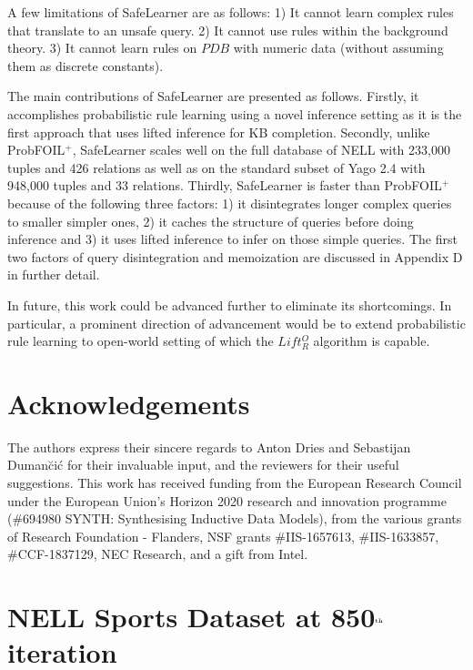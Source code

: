 \documentclass[akbc,twoside,11pt]{article}
\newcommand{\algorithmname}{SafeLearner\xspace}
\begin{document}
A few limitations of \algorithmname are as follows: 1) It cannot learn complex rules that translate to an unsafe query. 2) It cannot use rules within the background theory. %
3) It cannot learn rules on $PDB$ with numeric data (without assuming them as discrete constants).

The main contributions of \algorithmname are presented as follows. Firstly, it accomplishes probabilistic rule learning using a novel inference setting as it is the first approach that uses lifted inference for KB completion. Secondly, unlike ProbFOIL$^+$, \algorithmname scales well on the full database of NELL with 233,000 tuples and 426 relations as well as on the standard subset of Yago 2.4 with 948,000 tuples and 33 relations. Thirdly, \algorithmname is faster than ProbFOIL$^+$ because of the following three factors: 1) it disintegrates longer complex queries to smaller simpler ones, 2) it caches the structure of queries before doing inference and 3) it uses lifted inference to infer on those simple queries. The first two factors of query disintegration and memoization are discussed in Appendix D in further detail.

In future, this work could be advanced further to eliminate its shortcomings. In particular, a prominent direction of advancement would be to extend probabilistic rule learning to open-world setting of which the $Lift^O_R$ algorithm \cite{DBLP:conf/kr/CeylanDB16} is capable.

\section*{Acknowledgements}
The authors express their sincere regards to Anton Dries and Sebastijan Duman\u{c}i\'c for their invaluable input, and the reviewers for their useful suggestions. This work has received funding from the European Research Council under the European Union's Horizon 2020 research and innovation programme (\#694980 SYNTH: Synthesising Inductive Data Models), from the various grants of Research Foundation - Flanders,  NSF grants \#IIS-1657613, \#IIS-1633857, \#CCF-1837129, NEC Research, and a gift from Intel.





\appendix
\section{NELL Sports Dataset at 850$^{\mbox{\tiny th}}$ iteration}\label{appendix:1}
\end{document}
